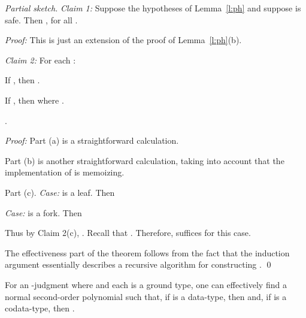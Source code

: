 \documentclass[envcountsame]{llncs}
\begin{document}
\begin{proof}[Partial sketch]
\smallskip\noindent\emph{Claim 1:} Suppose the 
hypotheses of Lemma~\ref{l:ph} and suppose  is safe.
Then 
,
  for all .

\smallskip\noindent\emph{Proof:}
This is just an extension of the proof of Lemma~\ref{l:ph}(b).


\smallskip\noindent\emph{Claim 2:} For each :
\begin{asparaenum}[(a)]
  \item If , 
  	then .
  \item If , 
  	then 
	      where .
  \item .
\end{asparaenum}

\smallskip\noindent\emph{Proof:}
Part (a) is a  straightforward calculation.  

Part (b) is another straightforward calculation, taking into 
account that the implementation of  is memoizing.

Part (c). \emph{Case:}  is a leaf. 
Then

\emph{Case:}  is a fork. 
Then


Thus by Claim 2(c), .
Recall that .
Therefore,  suffices for this case.

The effectiveness part of the theorem follows from the fact
that the induction argument essentially describes a recursive 
algorithm for constructing .  \qed
\end{proof}





\begin{theorem}
  For an -judgment  where
   and each  is a ground type, one
  can effectively find a normal second-order polynomial  such
  that, if  is a data-type, then  and, if  is a codata-type, then
  .
\end{theorem}  
\end{document}
